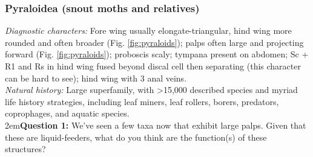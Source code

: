 \documentclass[letterpaper, 11pt]{article}
\begin{document}
\subsubsection{Pyraloidea (snout moths and relatives)}
\noindent{}\textit{Diagnostic characters:} Fore wing usually elongate-triangular, hind wing more rounded and often broader (Fig. \ref{fig:pyraloids}); palps often large and projecting forward (Fig. \ref{fig:pyraloids}); proboscis scaly; tympana present on abdomen; Sc + R1 and Rs in hind wing fused beyond discal cell then separating (this character can be hard to see); hind wing with 3 anal veins.\\

\noindent{}\textit{Natural history:} Large superfamily, with \textgreater{}15,000 described species and myriad life history strategies, including leaf miners, leaf rollers, borers, predators, coprophages, and aquatic species. \\

\hangindent2em\textbf{Question 1:} We've seen a few taxa now that exhibit large palps. Given that these are liquid-feeders, what do you think are the function(s) of these structures?\\
\end{document}
